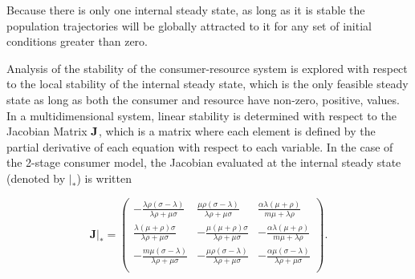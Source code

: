 \documentclass[12pt,english]{article}
\begin{document}
\begin{spacing}{1.9}
\noindent Because there is only one internal steady state, as long as it is stable the population trajectories will be globally attracted to it for any set of initial conditions greater than zero.

Analysis of the stability of the consumer-resource system is explored with respect to the local stability of the internal steady state, which is the only feasible steady state as long as both the consumer and resource have non-zero, positive, values.
In a multidimensional system, linear stability is determined with respect to the Jacobian Matrix $\bf J$, which is a matrix where each element is defined by the partial derivative of each equation with respect to each variable.
In the case of the 2-stage consumer model, the Jacobian evaluated at the internal steady state (denoted by $|_*$) is written

\begin{equation}
\mathbf{J}|_* =
\left(
\begin{array}{ccc}
 -\frac{\lambda  \rho  (\sigma - \lambda )}{\lambda  \rho +\mu  \sigma } & \frac{\mu  \rho  (\sigma -\lambda )}{\lambda  \rho +\mu  \sigma } & \frac{\alpha  \lambda  (\mu +\rho )}{m \mu +\lambda  \rho } \\
 \frac{\lambda  (\mu +\rho ) \sigma }{\lambda  \rho +\mu  \sigma } & -\frac{\mu  (\mu +\rho ) \sigma }{\lambda  \rho +\mu  \sigma } & -\frac{\alpha  \lambda  (\mu +\rho )}{m \mu +\lambda  \rho } \\
 -\frac{m \mu  (\sigma - \lambda)}{\lambda  \rho +\mu  \sigma } & -\frac{\mu  \rho  (\sigma - \lambda )}{\lambda  \rho +\mu  \sigma } & -\frac{\alpha  \mu  (\sigma - \lambda)}{\lambda  \rho +\mu  \sigma } \\
\end{array}
\right).
\end{equation}



\end{spacing}
\end{document}
